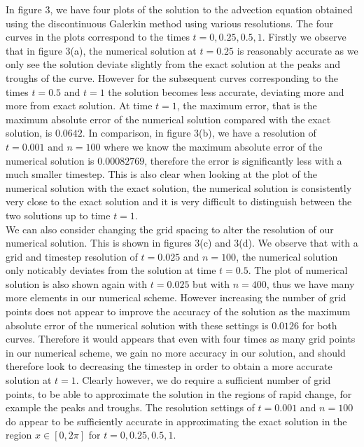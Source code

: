 \documentclass[a4paper, 12pt]{article}
\begin{document}
In figure 3, we have four plots of the solution to the advection equation obtained using the discontinuous Galerkin method using various resolutions. The four curves in the plots correspond to the times  $t=0,0.25,0.5,1$. Firstly we observe that in figure 3(a), the numerical solution at $t=0.25$ is reasonably accurate as we only see the solution deviate slightly from the exact solution at the peaks and troughs of the curve. However for the subsequent curves corresponding to the times $t=0.5$ and $t=1$ the solution becomes less accurate, deviating more and more from exact solution. At time $t=1$, the maximum error, that is the maximum absolute error of the numerical solution compared with the exact solution, is $0.0642$. In comparison, in figure 3(b), we have a resolution of $t=0.001$ and $n=100$ where we know the maximum absolute error of the numerical solution is $0.00082769$, therefore the error is significantly less with a much smaller timestep. This is also clear when looking at the plot of the numerical solution with the exact solution, the numerical solution is consistently very close to the exact solution and it is very difficult to distinguish between the two solutions up to time $t=1$. \\   
  
We can also consider changing the grid spacing to alter the resolution of our numerical solution. This is shown in figures 3(c) and 3(d). We observe that with a grid and timestep resolution of $t=0.025$ and $n=100$, the numerical solution only noticably deviates from the solution at time $t=0.5$. The plot of numerical solution is also shown again with $t=0.025$ but with $n=400$, thus we have many more elements in our numerical scheme. However increasing the number of grid points does not appear to improve the accuracy of the solution as the maximum absolute error of the numerical solution with these settings is $0.0126$ for both curves. Therefore it would appears that even with four times as many grid points in our numerical scheme, we gain no more accuracy in our solution, and should therefore look to decreasing the timestep in order to obtain a more accurate solution at $t=1$. Clearly however, we do require a sufficient number of grid points, to be able to approximate the solution in the regions of rapid change, for example the peaks and troughs. The resolution settings of $t=0.001$ and $n=100$ do appear to be sufficiently accurate in approximating the exact solution in the region $x\in[0,2\pi]$ for $t=0,0.25,0.5,1$.\\   
\end{document}
